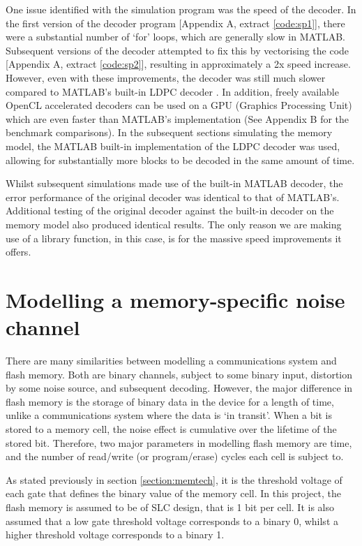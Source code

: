 \documentclass[11pt]{article}
\numberwithin{equation}{subsection}
\begin{document}
One issue identified with the simulation program was the speed of the decoder. In the first version of the decoder program [Appendix A, extract \ref{code:sp1}], there were a substantial number of `for' loops, which are generally slow in MATLAB. Subsequent versions of the decoder attempted to fix this by vectorising the code [Appendix A, extract \ref{code:sp2}], resulting in approximately a 2x speed increase. However, even with these improvements, the decoder was still much slower compared to MATLAB's built-in LDPC decoder \cite{matlab-ldpc}. In addition, freely available OpenCL accelerated decoders \cite{openCL} can be used on a GPU (Graphics Processing Unit) which are even faster than MATLAB's implementation (See Appendix B for the benchmark comparisons). In the subsequent sections simulating the memory model, the MATLAB built-in implementation of the LDPC decoder was used, allowing for substantially more blocks to be decoded in the same amount of time.

Whilst subsequent simulations made use of the built-in MATLAB decoder, the error performance of the original decoder was identical to that of MATLAB's. Additional testing of the original decoder against the built-in decoder on the memory model also produced identical results. The only reason we are making use of a library function, in this case, is for the massive speed improvements it offers.

\section{Modelling a memory-specific noise channel} \label{section:memory}
There are many similarities between modelling a communications system and flash memory. Both are binary channels, subject to some binary input, distortion by some noise source, and subsequent decoding. However, the major difference in flash memory is the storage of binary data in the device for a length of time, unlike a communications system where the data is `in transit'. When a bit is stored to a memory cell, the noise effect is cumulative over the lifetime of the stored bit. Therefore, two major parameters in modelling flash memory are time, and the number of read/write (or program/erase) cycles each cell is subject to.

As stated previously in section \ref{section:memtech}, it is the threshold voltage of each gate that defines the binary value of the memory cell. In this project, the flash memory is assumed to be of SLC design, that is 1 bit per cell. It is also assumed that a low gate threshold voltage corresponds to a binary 0, whilst a higher threshold voltage corresponds to a binary 1. 
\end{document}
